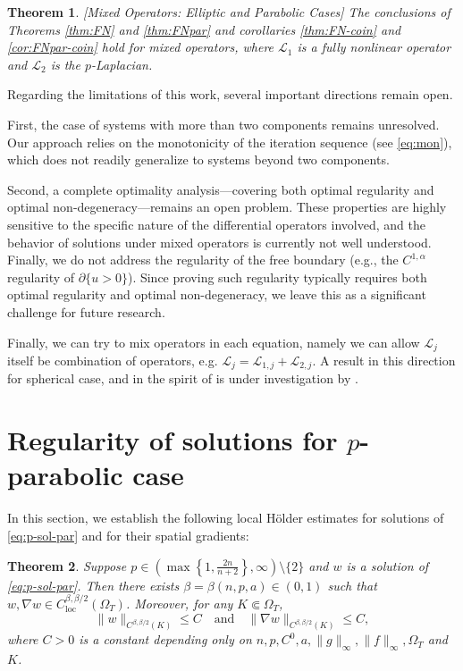 \documentclass[11pt,oneside,english]{amsart}
\newcommand{\cL}{{\mathcal L}}
\newcommand{\be}{\beta}
\newcommand{\loc}{\operatorname{loc}}
\newcommand{\D}{\nabla}
\numberwithin{equation}{section}
\newtheorem{theorem}{Theorem}
\theoremstyle{plain}
\numberwithin{equation}{section}
\begin{document}
\begin{theorem}\label{eq:mixed}[Mixed Operators: Elliptic and Parabolic Cases]
    The conclusions of Theorems \ref{thm:FN} and \ref{thm:FNpar} and corollaries \ref{thm:FN-coin} and \ref{cor:FNpar-coin} hold for mixed operators, where $\cL_1$ is a fully nonlinear operator and $\cL_2$ is the $p$-Laplacian.
\end{theorem}



Regarding the limitations of this work, several important directions remain open. 

First, the case of systems with more than two components remains 
unresolved. Our approach relies on the monotonicity of the iteration 
sequence (see \eqref{eq:mon}), which does not readily generalize to systems beyond 
two components. 

Second, a complete optimality analysis—covering both optimal regularity and 
optimal non-degeneracy—remains an open problem. These properties are highly 
sensitive to the specific nature of the differential operators involved, and 
the behavior of solutions under mixed operators is currently not well 
understood. Finally, we do not address the regularity of the free boundary 
(e.g., the $C^{1,\alpha}$ regularity of $\partial\{u>0\}$). Since proving such 
regularity typically requires both optimal regularity and optimal 
non-degeneracy, we leave this as a significant challenge for future 
research.

Finally, we can try to mix operators in each equation, namely we can allow $\cL_j$ itself be combination of operators, e.g. 
$\cL_j =  \cL_{1,j} + \cL_{2,j}$. A result in this direction for spherical case, and in the spirit of \cite{ELSH25} is under investigation by \cite{Khademloo}.



\appendix


\section{Regularity of solutions for \texorpdfstring{$p$-parabolic}{p-parabolic}  case}\label{appen:par-p-Lapl-reg}
In this section, we establish the following local Hölder estimates for solutions of \eqref{eq:p-sol-par} and for their spatial gradients:

\begin{theorem}
    \label{thm:p-reg-par}
    Suppose $p\in\left(\max\left\{1, \frac{2n}{n+2}\right\},\infty\right)\setminus\{2\}$ and $w$ is a solution of \eqref{eq:p-sol-par}. Then there exists $\be=\be(n,p,a)\in(0,1)$ such that $w,\D w\in C_{\loc}^{\be,\be/2}(\Omega_T)$. Moreover, for any $K\Subset\Omega_T$,
    $$
    \|w\|_{C^{\be,\be/2}(K)}\le C\quad\text{and}\quad \|\D w\|_{C^{\be,\be/2}(K)}\le C,
    $$
    where $C>0$ is a constant depending only on $n,p,C^0,a,\|g\|_\infty,\|f\|_\infty, \Omega_T$ and $K$.
\end{theorem}
\end{document}
